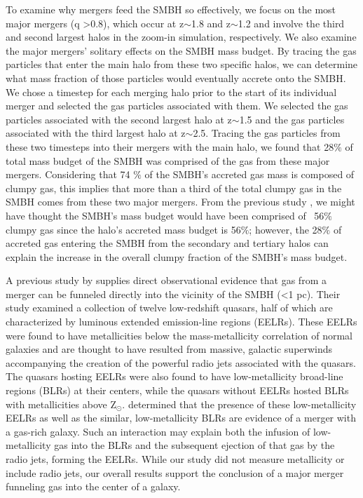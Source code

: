 \documentclass[]{emulateapj}
\begin{document}
To examine why mergers feed the SMBH so effectively, we focus on the most major mergers (q \textgreater 0.8), which occur at  z$\sim$1.8 and z$\sim$1.2 and involve the third and second largest halos in the zoom-in simulation, respectively. We also examine the major mergers' solitary effects on the SMBH mass budget. By tracing the gas particles that enter the main halo from these two specific halos, we can determine what mass fraction of those particles would eventually accrete onto the SMBH. We chose a timestep for each merging halo prior to the start of its individual merger and selected the gas particles associated with them. We selected the gas particles associated with the second largest halo at z$\sim$1.5 and the gas particles associated with the third largest halo at z$\sim$2.5. Tracing the gas particles from these two timesteps into their mergers with the main halo, we found that 28$\%$ of total mass budget of the SMBH was comprised of the gas from these major mergers. Considering that 74 $\%$ of the SMBH's accreted gas mass is composed of clumpy gas, this implies that more than a third of the total clumpy gas in the SMBH comes from these two major mergers. From the previous study \citep{Bellovary2013}, we might have thought the SMBH's mass budget would have been comprised of ~56$\%$ clumpy gas since the halo's accreted mass budget is 56$\%$; however, the 28$\%$ of accreted gas entering the SMBH from the secondary and tertiary halos can explain the increase in the overall clumpy fraction of the SMBH's mass budget.

A previous study by \cite{Fu2007} supplies direct observational evidence that gas from a merger can be funneled directly into the vicinity of the SMBH (\textless 1 pc). Their study examined a collection of twelve low-redshift quasars, half of which are characterized by luminous extended emission-line regions (EELRs). These EELRs were found to have metallicities below the mass-metallicity correlation of normal galaxies and are thought to have resulted from massive, galactic superwinds accompanying the creation of the powerful radio jets associated with the quasars. The quasars hosting EELRs were also found to have low-metallicity broad-line regions (BLRs) at their centers, while the quasars without EELRs hosted BLRs with metallicities above Z$_{\odot}$. \cite{Fu2007} determined that the presence of these low-metallicity EELRs as well as the similar, low-metallicity BLRs are evidence of a merger with a gas-rich galaxy. Such an interaction may explain both the infusion of low-metallicity gas into the BLRs and the subsequent ejection of that gas by the radio jets, forming the EELRs.  While our study did not measure metallicity or include radio jets, our overall results support the conclusion of a major merger funneling gas into the center of a galaxy. 
\end{document}
